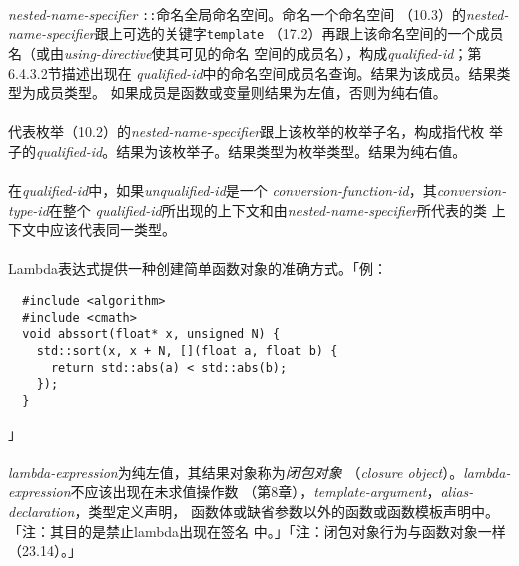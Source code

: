 \paragraph{}
\textit{nested-name-specifier} \texttt{::}命名全局命名空间。命名一个命名空间
（10.3）的\textit{nested-name-specifier}跟上可选的关键字\texttt{template}
（17.2）再跟上该命名空间的一个成员名（或由\textit{using-directive}使其可见的命名
空间的成员名），构成\textit{qualified-id}；第6.4.3.2节描述出现在
\textit{qualified-id}中的命名空间成员名查询。结果为该成员。结果类型为成员类型。
如果成员是函数或变量则结果为左值，否则为纯右值。

\paragraph{}
代表枚举（10.2）的\textit{nested-name-specifier}跟上该枚举的枚举子名，构成指代枚
举子的\textit{qualified-id}。结果为该枚举子。结果类型为枚举类型。结果为纯右值。

\paragraph{}
在\textit{qualified-id}中，如果\textit{unqualified-id}是一个
\textit{conversion-function-id}，其\textit{conversion-type-id}在整个
\textit{qualified-id}所出现的上下文和由\textit{nested-name-specifier}所代表的类
上下文中应该代表同一类型。


\paragraph{}
Lambda表达式提供一种创建简单函数对象的准确方式。「例：
\begin{lstlisting}
  #include <algorithm>
  #include <cmath>
  void abssort(float* x, unsigned N) {
    std::sort(x, x + N, [](float a, float b) {
      return std::abs(a) < std::abs(b);
    });
  }
\end{lstlisting}」

\paragraph{}
\textit{lambda-expression}为纯左值，其结果对象称为\textit{闭包对象}
（\textit{closure object}）。\textit{lambda-expression}不应该出现在未求值操作数
（第8章），\textit{template-argument}，\textit{alias-declaration}，类型定义声明，
函数体或缺省参数以外的函数或函数模板声明中。「注：其目的是禁止lambda出现在签名
中。」「注：闭包对象行为与函数对象一样（23.14）。」

